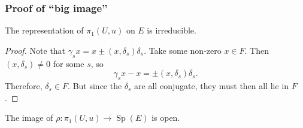 \documentclass[letterpaper,11pt]{article}
\DeclareMathOperator{\Sp}{Sp}
\begin{document}
\subsubsection{Proof of ``big image''}
\begin{cor}
The representation of $\pi_1(U,u)$ on $E$ is irreducible.
\end{cor}

\begin{proof}
Note that $\gamma_s x  = x \pm (x, \delta_s) \delta_s$. Take some non-zero $x \in F$. Then $(x, \delta_s) \neq 0$ for some $s$, so 
\[
\gamma_s x - x = \pm (x, \delta_s) \delta_s.
\]
Therefore, $\delta_s \in F$. But since the $\delta_s$ are all conjugate, they must then all lie in $F$. 
\end{proof}

\begin{thm}\label{big_image}
The image of $\rho \colon \pi_1(U,u) \rightarrow \Sp(E)$ is open.
\end{thm}
\end{document}
